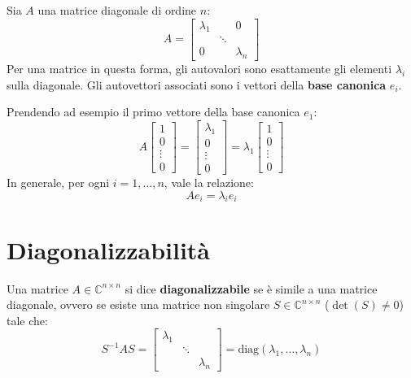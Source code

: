\documentclass[a4paper,12pt]{article}
\begin{document}
	\vspace{0.5cm}
	
	\begin{tcolorbox}[title=Esempio: Matrice Diagonale, colback=white]
		Sia $A$ una matrice diagonale di ordine $n$:
		\[
		A = \begin{bmatrix}
			\lambda_1 & & 0 \\
			& \ddots & \\
			0 & & \lambda_n
		\end{bmatrix}
		\]
		Per una matrice in questa forma, gli autovalori sono esattamente gli elementi $\lambda_i$ sulla diagonale. Gli autovettori associati sono i vettori della \textbf{base canonica} $e_i$.
		
		\medskip
		Prendendo ad esempio il primo vettore della base canonica $e_1$:
		\[
		A \begin{bmatrix} 1 \\ 0 \\ \vdots \\ 0 \end{bmatrix} = 
		\begin{bmatrix} \lambda_1 \\ 0 \\ \vdots \\ 0 \end{bmatrix} = 
		\lambda_1 \begin{bmatrix} 1 \\ 0 \\ \vdots \\ 0 \end{bmatrix}
		\]
		In generale, per ogni $i=1, \dots, n$, vale la relazione:
		\begin{equation}
			A e_i = \lambda_i e_i
		\end{equation}
	\end{tcolorbox}
	\section{Diagonalizzabilità}
	
	\begin{tcolorbox}[title=Definizione: Matrice Diagonalizzabile]
		Una matrice $A \in \mathbb{C}^{n \times n}$ si dice \textbf{diagonalizzabile} se è simile a una matrice diagonale, ovvero se esiste una matrice non singolare $S \in \mathbb{C}^{n \times n}$ ($\det(S) \neq 0$) tale che:
		\begin{equation}
			S^{-1} A S = \begin{bmatrix} \lambda_1 & & \\ & \ddots & \\ & & \lambda_n \end{bmatrix} = \text{diag}(\lambda_1, \dots, \lambda_n)
		\end{equation}
	\end{tcolorbox}
	
\end{document}
